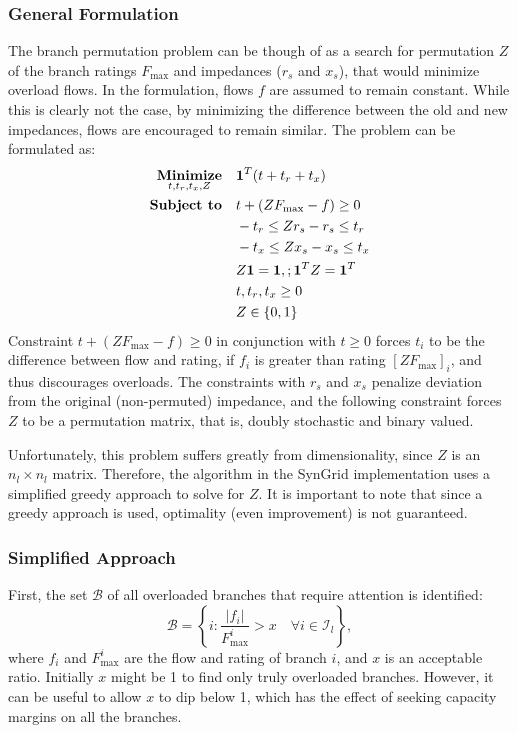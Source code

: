 \documentclass[12pt]{article}
\newcommand{\syngrid}[0]{{SynGrid}}
\numberwithin{equation}{section}
\numberwithin{table}{section}
\numberwithin{figure}{section}
\begin{document}
\subsubsection{General Formulation}
The branch permutation problem can be though of as a search for permutation $Z$ of the branch ratings $F_{\text{max}}$ and impedances ($r_s$ and $x_s$), that would minimize overload flows.
In the formulation, flows $f$ are assumed to remain constant.
While this is clearly not the case, by minimizing the difference between the old and new impedances, flows are encouraged to remain similar.
The problem can be formulated as:
\begin{equation}
\begin{aligned}
\underset{ t, t_r, t_x, Z}{\text{\bfseries Minimize}} \quad & \mathbf{1}^T  (t + t_r + t_x)\\
\text{\bfseries Subject to} \quad & t + (Z F_{\text{max}} - f) \geq 0 \\
						& - t_r \leq Z r_s - r_s \leq t_r \\
						& - t_x \leq Z x_s - x_s \leq t_x \\
						&Z \mathbf{1} = \mathbf{1},; \mathbf{1}^T Z= \mathbf{1}^T \\
						& t, t_r, t_x \geq 0 \\
						&Z\in\{0,1\}
\end{aligned}
\end{equation}
Constraint $t + (ZF_{\text{max}} - f) \geq 0$ in conjunction with $t \geq 0$ forces $t_i$ to be the difference between flow and rating, if $f_i$ is greater than rating $[ZF_{\text{max}}]_i$, and thus discourages overloads.
The constraints with $r_s$ and $x_s$ penalize deviation from the original (non-permuted) impedance, and the following constraint forces $Z$ to be a permutation matrix, that is, doubly stochastic and binary valued.

Unfortunately, this problem suffers greatly from dimensionality, since $Z$ is an $n_l \times n_l$ matrix.
Therefore, the algorithm in the \syngrid{} implementation uses a simplified greedy approach to solve for $Z$.
It is important to note that since a greedy approach is used, optimality (even improvement) is not guaranteed.

\subsubsection{Simplified Approach}
First, the set $\mathcal{B}$ of all overloaded branches that require attention is identified:
\begin{equation}
	\mathcal{B} = \left\{i: \frac{|f_i|}{F^i_{\text{max}}} > x \quad \forall i \in \mathcal{I}_l\right\},
\end{equation}
where $f_i$ and $F^i_{\text{max}}$ are the flow and rating of branch $i$, and $x$ is an acceptable ratio.
Initially $x$ might be 1 to find only truly overloaded branches.
However, it can be useful to allow $x$ to dip below 1, which has the effect of seeking capacity margins on all the branches.
\end{document}
